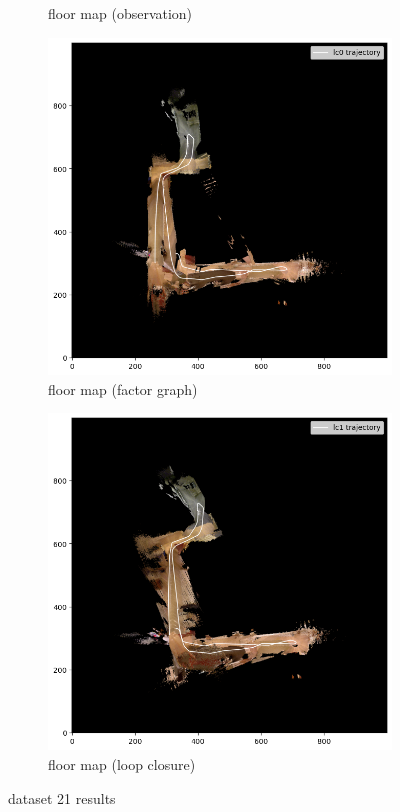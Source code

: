 \documentclass[conference]{IEEEtran}
\begin{document}
\begin{figure}[htbp]
\begin{subfigure}{0.24\textwidth}
        \caption{floor map (observation)}
        \label{fig:fmap_21_icp}
    \end{subfigure}
    \hfill
    \begin{subfigure}{0.24\textwidth}
        \includegraphics[width=\linewidth]{../img/fmap_21_lc0.png}
        \caption{floor map (factor graph)}
        \label{fig:fmap_21_lc0}
    \end{subfigure}
    \hfill
    \begin{subfigure}{0.24\textwidth}
        \includegraphics[width=\linewidth]{../img/fmap_21_lc1.png}
        \caption{floor map (loop closure)}
        \label{fig:fmap_21_lc1}
    \end{subfigure}
    
    \caption{dataset 21 results}
    \label{fig:dataset21}
\end{figure}
\end{document}
